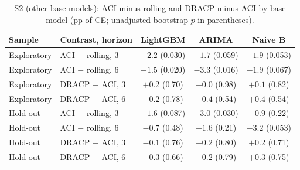 \begin{table}[H]
\centering
\caption{S2 (other base models): ACI minus rolling and DRACP minus ACI by base model (pp of CE; unadjusted bootstrap $p$ in parentheses).}
\label{tab:s2full}
\small
\begin{tabular}{@{}llccc@{}}
\toprule
Sample & Contrast, horizon & LightGBM & ARIMA & Naive B \\
\midrule
Exploratory & ACI $-$ rolling, 3 & $-2.2$ (0.030) & $-1.7$ (0.059) & $-1.9$ (0.053) \\
Exploratory & ACI $-$ rolling, 6 & $-1.5$ (0.020) & $-3.3$ (0.016) & $-1.9$ (0.067) \\
Exploratory & DRACP $-$ ACI, 3 & $+0.2$ (0.70) & $+0.0$ (0.98) & $+0.1$ (0.82) \\
Exploratory & DRACP $-$ ACI, 6 & $-0.2$ (0.78) & $-0.4$ (0.54) & $+0.4$ (0.54) \\
Hold-out & ACI $-$ rolling, 3 & $-1.6$ (0.087) & $-3.0$ (0.030) & $-0.9$ (0.22) \\
Hold-out & ACI $-$ rolling, 6 & $-0.7$ (0.48) & $-1.6$ (0.21) & $-3.2$ (0.053) \\
Hold-out & DRACP $-$ ACI, 3 & $-0.1$ (0.76) & $-0.2$ (0.80) & $+0.2$ (0.71) \\
Hold-out & DRACP $-$ ACI, 6 & $-0.3$ (0.66) & $+0.2$ (0.79) & $+0.3$ (0.75) \\
\bottomrule
\end{tabular}
\end{table}

\begin{table}[H]
\centering
\caption{Calibration error / Winkler ratio / median width ratio relative to rolling conformal, by panel, interval method and horizon (LightGBM, warm-up 48; a ratio below 1 is better than rolling).}
\label{tab:width}
\small
\fittable{}
\end{table}

